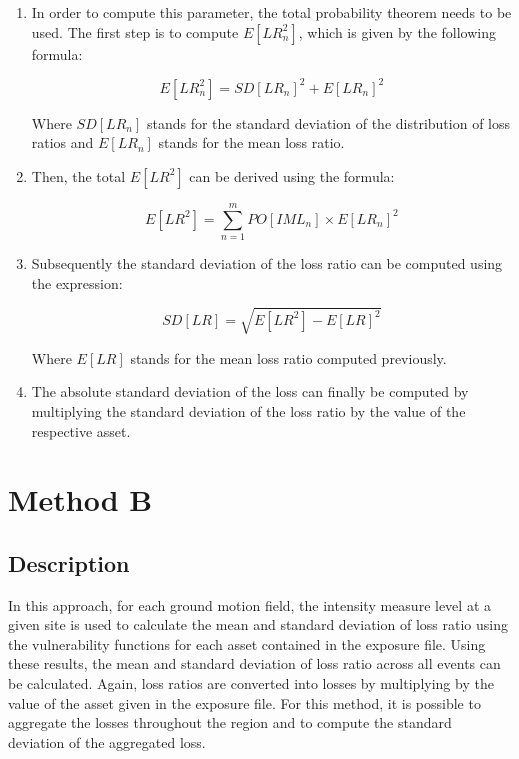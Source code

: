 \begin{enumerate}
\item In order to compute this parameter, the total probability theorem needs to be used. The first step is to compute $E[LR_n^2]$, which is given by the following formula:

\begin{equation}
E[LR_n^2]=SD[LR_n]^2+E[LR_n]^2
\end{equation}

Where $SD[LR_n]$ stands for the standard deviation of the distribution of loss ratios and $E[LR_n]$ stands for the mean loss ratio.

\item Then, the total $E[LR^2]$ can be derived using the formula:

\begin{equation}
E[LR^2]=\sum_{n=1}^mPO[IML_n] \times E[LR_n]^2
\end{equation}

\item Subsequently the standard deviation of the loss ratio can be computed using the expression:

\begin{equation}
SD[LR]=\sqrt{E[LR^2]-E[LR]^2}
\end{equation}

Where $E[LR]$ stands for the mean loss ratio computed previously.

\item The absolute standard deviation of the loss can finally be computed by multiplying the standard deviation of the loss ratio by the value of the respective asset.

\end{enumerate}

\section{Method B}
\subsection{Description}
In this approach, for each ground motion field, the intensity measure level at a given site is used to calculate the mean and standard deviation of loss ratio using the vulnerability functions for each asset contained in the exposure file. Using these results, the mean and standard deviation of loss ratio across all events can be calculated. Again, loss ratios are converted into losses by multiplying by the value of the asset given in the exposure file. For this method, it is possible to aggregate the losses throughout the region and to compute the standard deviation of the aggregated loss. 

